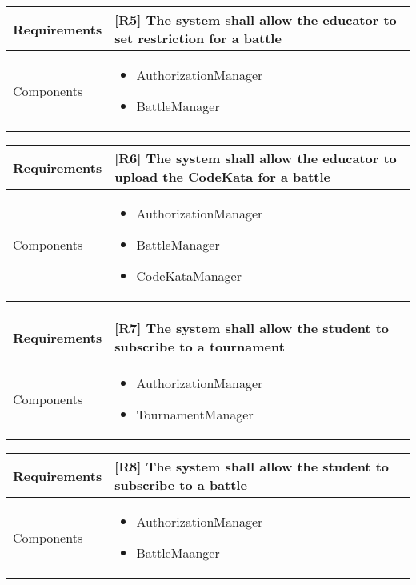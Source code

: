 \begin{tabular}{|p{3cm}|p{10cm}|}
    \hline
    Requirements & [R5] The system shall allow the educator to set restriction for a battle \\
    \hline
    Components & 
    \begin{itemize}
        \item AuthorizationManager
        \item BattleManager
    \end{itemize} 
    \\
    \hline
\end{tabular}

\begin{tabular}{|p{3cm}|p{10cm}|}
    \hline
    Requirements & [R6] The system shall allow the educator to upload the CodeKata for a battle \\
    \hline
    Components & 
    \begin{itemize}
        \item AuthorizationManager
        \item BattleManager
        \item CodeKataManager
    \end{itemize} 
    \\
    \hline
\end{tabular}

\begin{tabular}{|p{3cm}|p{10cm}|}
    \hline
    Requirements & [R7] The system shall allow the student to subscribe to a tournament \\
    \hline
    Components & 
    \begin{itemize}
        \item AuthorizationManager
        \item TournamentManager
    \end{itemize} 
    \\
    \hline
\end{tabular}

\begin{tabular}{|p{3cm}|p{10cm}|}
    \hline
    Requirements & [R8] The system shall allow the student to subscribe to a battle \\
    \hline
    Components & 
    \begin{itemize}
        \item AuthorizationManager
        \item BattleMaanger
    \end{itemize} 
    \\
    \hline
\end{tabular}

